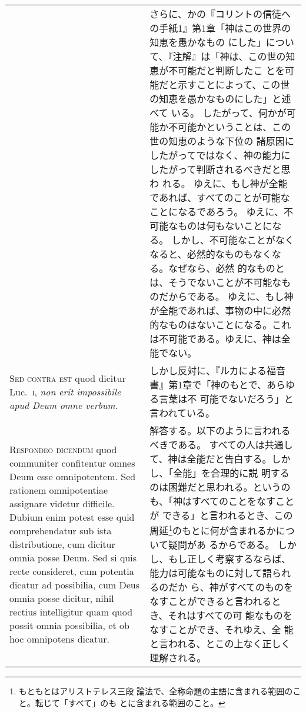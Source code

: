 \documentclass[10pt]{jsarticle} %
\begin{document}
\begin{longtable}{p{21em}p{21em}}
&

さらに、かの『コリントの信徒への手紙1』第1章「神はこの世界の知恵を愚かなもの
 にした」について、『注解』は「神は、この世の知恵が不可能だと判断したこ
 とを可能だと示すことによって、この世の知恵を愚かなものにした」と述べて
 いる。
したがって、何かが可能か不可能かということは、この世の知恵のような下位の
 諸原因にしたがってではなく、神の能力にしたがって判断されるべきだと思わ
 れる。
ゆえに、もし神が全能であれば、すべてのことが可能なことになるであろう。
ゆえに、不可能なものは何もないことになる。
しかし、不可能なことがなくなると、必然的なものもなくなる。なぜなら、必然
 的なものとは、そうでないことが不可能なものだからである。
ゆえに、もし神が全能であれば、事物の中に必然的なものはないことになる。これ
 は不可能である。ゆえに、神は全能でない。


\\


{\scshape Sed contra est} quod dicitur Luc.~{\scshape i}, {\itshape non erit
impossibile apud Deum omne verbum}.


&

しかし反対に、『ルカによる福音書』第1章で「神のもとで、あらゆる言葉は不
 可能でないだろう」と言われている。

\\


{\scshape Respondeo dicendum} quod communiter confitentur
omnes Deum esse omnipotentem. Sed rationem omnipotentiae assignare
videtur difficile. Dubium enim potest esse quid comprehendatur sub ista
distributione, cum dicitur omnia posse Deum. Sed si quis recte
consideret, cum potentia dicatur ad possibilia, cum Deus omnia posse
dicitur, nihil rectius intelligitur quam quod possit omnia possibilia,
et ob hoc omnipotens dicatur. 


&

解答する。以下のように言われるべきである。
すべての人は共通して、神は全能だと告白する。しかし、「全能」を合理的に説
 明するのは困難だと思われる。というのも、「神はすべてのことをなすことが
 できる」と言われるとき、この周延\footnote{もともとはアリストテレス三段
 論法で、全称命題の主語に含まれる範囲のこと。転じて「すべて」のも
 とに含まれる範囲のこと。}のもとに何が含まれるかについて疑問があ
 るからである。
しかし、もし正しく考察するならば、能力は可能なものに対して語られるのだか
 ら、神がすべてのものをなすことができると言われるとき、それはすべての可
 能なものをなすことができ、それゆえ、全
 能と言われる、とこの上なく正しく理解される。

\\




\end{longtable}
\end{document}

